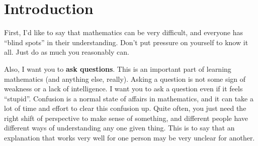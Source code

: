 \documentclass{article}
\begin{document}



\section*{Introduction}

First, I'd like to say that mathematics can be very difficult, and everyone 
has ``blind spots'' in their understanding. Don't put pressure on yourself
to know it all. Just do as much you reasonably can. 

Also, I want you to \textbf{ask questions}. This is an important part
of learning mathematics (and anything else, really). Asking a question 
is not some sign of weakness or a lack of intelligence. I want you to
ask a question even if it feels ``stupid''. Confusion is a normal state
of affairs in mathematics, and it can take a lot of time and effort to 
clear this confusion up. Quite often, you just need the right shift of perspective
to make sense of something, and different people have different ways
of understanding any one given thing. This is to say that an explanation that 
works very well for one person may be very unclear for another.




\end{document}
